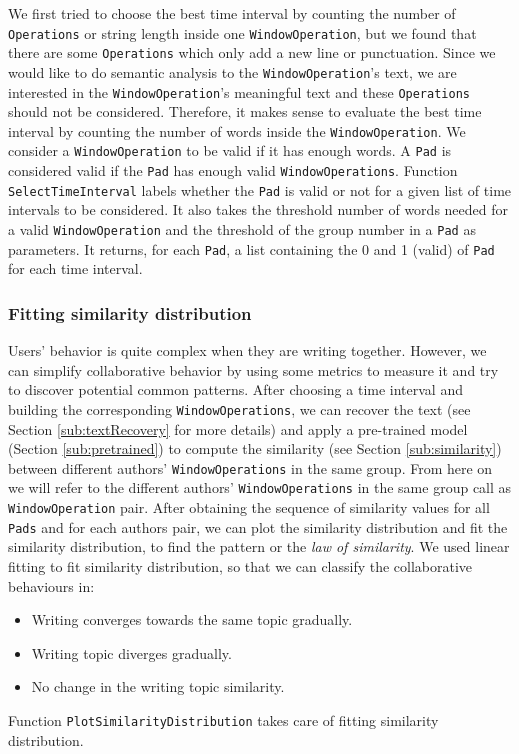       We first tried to choose the best time interval by counting the number of \texttt{Operations} or string length inside one \texttt{WindowOperation}, but we found that there are some \texttt{Operations} which only add a new line or punctuation. Since we would like to do semantic analysis to the \texttt{WindowOperation}'s text, we are interested in the \texttt{WindowOperation}'s meaningful text and these \texttt{Operations} should not be considered. Therefore, it makes sense to evaluate the best time interval by counting the number of words inside the \texttt{WindowOperation}. We consider a \texttt{WindowOperation} to be valid if it has enough words. A \texttt{Pad} is considered valid if the \texttt{Pad} has enough valid \texttt{WindowOperations}. Function \texttt{SelectTimeInterval} labels whether the  \texttt{Pad} is valid or not for a given list of time intervals to be considered. It also takes the threshold number of words needed for a valid \texttt{WindowOperation} and the threshold of the group number in a \texttt{Pad} as parameters. It returns, for each \texttt{Pad}, a list containing the 0 and 1 (valid) of \texttt{Pad} for each time interval.

      \subsubsection{Fitting similarity distribution} Users' behavior is quite complex when they are writing together. However, we can simplify collaborative behavior by using some metrics to measure it and try to discover potential common patterns. After choosing a time interval and building the corresponding \texttt{WindowOperations}, we can recover the text (see Section \ref{sub:textRecovery} for more details) and apply a pre-trained model (Section \ref{sub:pretrained}) to compute the similarity (see Section \ref{sub:similarity}) between different authors' \texttt{WindowOperations} in the same group. From here on we will refer to the different authors' \texttt{WindowOperations} in the same group call as \texttt{WindowOperation} pair. After obtaining the sequence of similarity values for all \texttt{Pads} and for each authors pair, we can plot the similarity distribution and fit the similarity distribution, to find the pattern or the \textit{law of similarity}. We used linear fitting to fit similarity distribution, so that we can classify the collaborative behaviours in: 
      \begin{itemize}
          \item Writing converges towards the same topic gradually.
          \item Writing topic diverges gradually.
          \item No change in the writing topic similarity.
      \end{itemize}
      Function \texttt{PlotSimilarityDistribution} takes care of fitting similarity distribution.
    